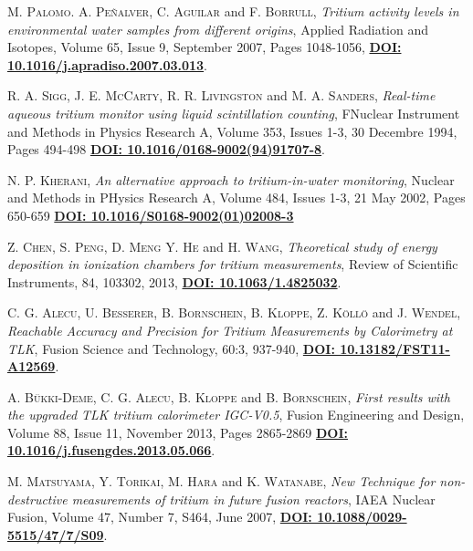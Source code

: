 \begin{thebibliography}{100}
 \textsc{M. Palomo}. \textsc{A. Peñalver}, \textsc{C. Aguilar} and \textsc{F. Borrull},
\textit{Tritium activity levels in environmental water samples from different origins}, Applied Radiation and Isotopes, Volume 65, Issue 9, September 2007, Pages 1048-1056, \href{https://doi.org/10.1016/j.apradiso.2007.03.013}{\textbf{DOI: 10.1016/j.apradiso.2007.03.013}}.

 \textsc{R. A. Sigg}, \textsc{J. E. McCarty}, \textsc{R. R. Livingston} and \textsc{M. A. Sanders},
\textit{Real-time aqueous tritium monitor using liquid scintillation counting}, FNuclear Instrument and Methods in Physics Research A, Volume 353, Issues 1-3, 30 Decembre 1994, Pages 494-498 \href{https://doi.org/10.1016/0168-9002(94)91707-8}{\textbf{DOI: 10.1016/0168-9002(94)91707-8}}.


 \textsc{N. P. Kherani},
\textit{An alternative approach to tritium-in-water monitoring}, Nuclear and Methods in PHysics Research A, Volume 484, Issues 1-3, 21 May 2002, Pages 650-659 \href{https://doi.org/10.1016/S0168-9002(01)02008-3}{\textbf{DOI: 10.1016/S0168-9002(01)02008-3}}

 \textsc{Z. Chen}, \textsc{S. Peng}, \textsc{D. Meng} \textsc{Y. He} and \textsc{H. Wang},
\textit{Theoretical study of energy deposition in ionization chambers for tritium measurements}, Review of Scientific Instruments, 84, 103302, 2013, \href{https://dx.doi.org/10.1063/1.4825032}{\textbf{DOI: 10.1063/1.4825032}}.

 \textsc{C. G. Alecu}, \textsc{U. Besserer}, \textsc{B. Bornschein}, \textsc{B. Kloppe}, \textsc{Z. Köllö} and \textsc{J. Wendel},
\textit{Reachable Accuracy and Precision for Tritium Measurements by Calorimetry at TLK}, Fusion Science and Technology, 60:3, 937-940, \href{https://doi.org/10.13182/FST11-A12569}{\textbf{DOI: 10.13182/FST11-A12569}}.

 \textsc{A. Bükki-Deme}, \textsc{C. G. Alecu}, \textsc{B. Kloppe} and \textsc{B. Bornschein},
\textit{First results with the upgraded TLK tritium calorimeter IGC-V0.5}, Fusion Engineering and Design, Volume 88, Issue 11, November 2013, Pages 2865-2869 \href{https://doi.org/10.1016/j.fusengdes.2013.05.066}{\textbf{DOI: 10.1016/j.fusengdes.2013.05.066}}.

 \textsc{M. Matsuyama}, \textsc{Y. Torikai}, \textsc{M. Hara} and \textsc{K. Watanabe},
\textit{New Technique for non-destructive measurements of tritium in future fusion reactors}, IAEA Nuclear Fusion, Volume 47, Number 7, S464, June 2007, \href{https://doi.org/10.1088/0029-5515/47/7/S09}{\textbf{DOI: 10.1088/0029-5515/47/7/S09}}.


\end{thebibliography}
